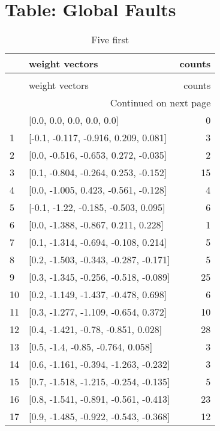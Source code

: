 \documentclass{article}%
\begin{document}
%
\normalsize%
\section{Table: Global Faults }%
\label{sec:TableGlobalFaults}%
\begin{longtable}{llr}
\caption{Five first}\\
\toprule
{} &                         weight vectors &  counts \\
\midrule
\endfirsthead
\caption[]{Five first} \\
\toprule
{} &                         weight vectors &  counts \\
\midrule
\endhead
\midrule
\multicolumn{3}{r}{{Continued on next page}} \\
\midrule
\endfoot

\bottomrule
\endlastfoot
0   &              [0.0, 0.0, 0.0, 0.0, 0.0] &       0 \\
1   &   [-0.1, -0.117, -0.916, 0.209, 0.081] &       3 \\
2   &   [0.0, -0.516, -0.653, 0.272, -0.035] &       2 \\
3   &   [0.1, -0.804, -0.264, 0.253, -0.152] &      15 \\
4   &   [0.0, -1.005, 0.423, -0.561, -0.128] &       4 \\
5   &   [-0.1, -1.22, -0.185, -0.503, 0.095] &       6 \\
6   &    [0.0, -1.388, -0.867, 0.211, 0.228] &       1 \\
7   &   [0.1, -1.314, -0.694, -0.108, 0.214] &       5 \\
8   &  [0.2, -1.503, -0.343, -0.287, -0.171] &       5 \\
9   &  [0.3, -1.345, -0.256, -0.518, -0.089] &      25 \\
10  &   [0.2, -1.149, -1.437, -0.478, 0.698] &       6 \\
11  &   [0.3, -1.277, -1.109, -0.654, 0.372] &      10 \\
12  &    [0.4, -1.421, -0.78, -0.851, 0.028] &      28 \\
13  &      [0.5, -1.4, -0.85, -0.764, 0.058] &       3 \\
14  &  [0.6, -1.161, -0.394, -1.263, -0.232] &       3 \\
15  &  [0.7, -1.518, -1.215, -0.254, -0.135] &       5 \\
16  &  [0.8, -1.541, -0.891, -0.561, -0.413] &      23 \\
17  &  [0.9, -1.485, -0.922, -0.543, -0.368] &      12 \\

\end{longtable}
\end{document}
